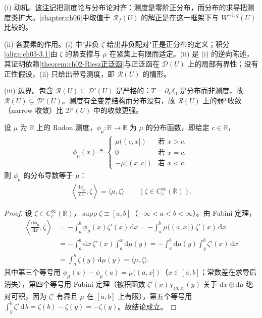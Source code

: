 \documentclass[../../main.tex]{subfiles}%
\begin{document}
\begin{remark}\label{remark:ch03-Radon即分布动机}
(i) 动机。\hyperref[remark:ch03-Radon即分布]{该注记}把测度论与分布论对齐：测度是零阶正分布，而分布的求导把测度类扩大。\cref{chapter:ch06}中取值于 $\mathscr{R}_f(U)$ 的解正是在这一框架下与 $W^{-1,q}(U)$ 比较的。

(ii) 各要素的作用。(i) 中"非负 $\zeta$ 给出非负配对"正是正分布的定义；积分\eqref{align:ch03-3.1}由 $\zeta$ 的紧支撑与 $\mu$ 在紧集上有限而适定。(ii) 是 (i) 的逆向陈述，其证明依赖\cref{theorem:ch02-Riesz正泛函}与正泛函在 $\mathcal{D}(U)$ 上的局部有界性；没有正性假设，(ii) 只给出带号测度，即 $\mathscr{R}(U)$ 的情形。

(iii) 边界。包含 $\mathscr{R}(U)\subseteq\mathcal{D}'(U)$ 是严格的：$T=\partial_k\delta_0$ 是分布而非测度，故 $\mathscr{R}(U)\subsetneq\mathcal{D}'(U)$。测度有全变差结构而分布没有，故 $\mathscr{R}(U)$ 上的弱*收敛（narrow 收敛）比 $\mathcal{D}'(U)$ 中的收敛更强。
\end{remark}

\begin{proposition}\label{proposition:ch03-分布函数导数}
设 $\mu$ 为 $\mathbb{R}$ 上的 Radon 测度，$\phi_\mu:\mathbb{R}\to\mathbb{R}$ 为 $\mu$ 的分布函数，即给定 $c\in\mathbb{R}$，
\begin{align*}
\phi_\mu(x)\triangleq\begin{cases}
\mu((c,x]) & \text{若 }x>c,\\
0 & \text{若 }x=c,\\
-\mu((x,c]) & \text{若 }x<c.
\end{cases}
\end{align*}
则 $\phi_\mu$ 的分布导数等于 $\mu$：
\begin{align*}
\left\langle\frac{\mathrm{d}\phi_\mu}{\mathrm{d}x},\zeta\right\rangle=\langle\mu,\zeta\rangle\qquad(\zeta\in C^\infty_c(\mathbb{R})).
\end{align*}
\end{proposition}

\begin{proof}
设 $\zeta\in C^\infty_c(\mathbb{R})$，$\operatorname{supp}\zeta\equiv[a,b]$（$-\infty<a<b<\infty$）。由 Fubini 定理，
\begin{align*}
\left\langle\frac{\mathrm{d}\phi_\mu}{\mathrm{d}x},\zeta\right\rangle
&=-\int_a^b\phi_\mu(x)\zeta'(x)\,\mathrm{d}x
=-\int_a^b\mu((a,x])\zeta'(x)\,\mathrm{d}x\\
&=-\int_a^b\mathrm{d}x\,\zeta'(x)\int_a^x\mathrm{d}\mu(y)
=-\int_a^b\mathrm{d}\mu(y)\int_y^b\zeta'(x)\,\mathrm{d}x\\
&=\int_a^b\zeta(y)\,\mathrm{d}\mu(y)=\langle\mu,\zeta\rangle.
\end{align*}
其中第三个等号用 $\phi_\mu(x)-\phi_\mu(a)=\mu((a,x])$（$x\in[a,b]$；常数差在求导后消失），第四个等号用 Fubini 定理（被积函数 $\zeta'(x)\chi_{(a,x]}(y)$ 关于 $\mathrm{d}x\otimes\mathrm{d}\mu$ 绝对可积，因为 $\zeta'$ 有界且 $\mu$ 在 $[a,b]$ 上有限），第五个等号用 $\int_y^b\zeta'\,\mathrm{d}\lambda=\zeta(b)-\zeta(y)=-\zeta(y)$。故结论成立。
\end{proof}
\end{document}
